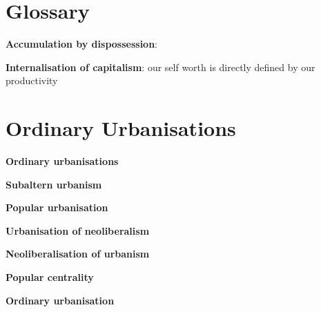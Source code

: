 \documentclass{article}
\begin{document}
\textbf{}

\textbf{}

\textbf{}

\section{Glossary}

\textbf{Accumulation by dispossession}:

\textbf{Internalisation of capitalism}: our self worth is directly defined by our productivity

\section{Ordinary Urbanisations}

\textbf{Ordinary urbanisations}

\textbf{Subaltern urbanism}

\textbf{Popular urbanisation}

\textbf{Urbanisation of neoliberalism}

\textbf{Neoliberalisation of urbanism}

\textbf{Popular centrality}

\textbf{Ordinary urbanisation}


\textbf{}


\textbf{}
\end{document}
